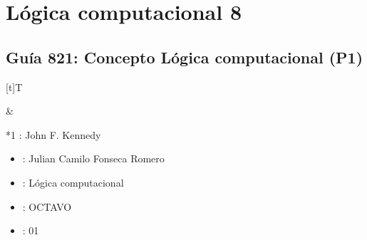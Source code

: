 \documentclass[letterpaper,10pt,spanish]{sphinxmanual}
\begin{document}
\sphinxstepscope


\chapter{Lógica computacional 8}
\label{\detokenize{1_guias/8logica/G820:logica-computacional-8}}\label{\detokenize{1_guias/8logica/G820::doc}}
\sphinxstepscope


\section{Guía 821: Concepto Lógica computacional (P1)}
\label{\detokenize{1_guias/8logica/G821:guia-821-concepto-logica-computacional-p1}}\label{\detokenize{1_guias/8logica/G821::doc}}

\begin{savenotes}\sphinxattablestart
\sphinxthistablewithglobalstyle
\centering
\begin{tabular}[t]{}
\sphinxtoprule
\sphinxtableatstartofbodyhook

\begin{savenotes}\sphinxattablestart
\sphinxthistablewithglobalstyle
\centering
\begin{tabulary}{\linewidth}[t]{T}
\sphinxtoprule
\sphinxtableatstartofbodyhook
\sphinxAtStartPar
{}
\\
\sphinxbottomrule
\end{tabulary}
\sphinxtableafterendhook\par
\sphinxattableend\end{savenotes}
&

\begin{savenotes}\sphinxattablestart
\sphinxthistablewithglobalstyle
\raggedright
\begin{tabular}[t]{*{1}{}}
\sphinxtoprule
\sphinxtableatstartofbodyhook
\sphinxAtStartPar
{}: John F. Kennedy
\begin{itemize}
\item {} 
\sphinxAtStartPar
{}: Julian Camilo Fonseca Romero

\item {} 
\sphinxAtStartPar
{}: Lógica computacional

\item {} 
\sphinxAtStartPar
{}: OCTAVO

\item {} 
\sphinxAtStartPar
{}: 01


\end{itemize}
\end{tabular}
\end{savenotes}
\end{tabular}
\end{savenotes}
\end{document}
